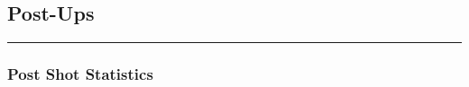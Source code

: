 \documentclass[a4paper,12pt]{article}
\begin{document}
\subsection{Post-Ups}

\vspace{1em} %
\hrule height 1pt width 1\textwidth %
\vspace{1em} %

\subsubsection{Post Shot Statistics}

\end{document}
